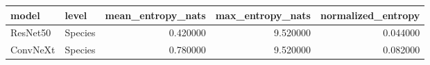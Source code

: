 \begin{tabular}{llrrr}
\toprule
model & level & mean_entropy_nats & max_entropy_nats & normalized_entropy \\
\midrule
ResNet50 & Species & 0.420000 & 9.520000 & 0.044000 \\
ConvNeXt & Species & 0.780000 & 9.520000 & 0.082000 \\
\bottomrule
\end{tabular}
